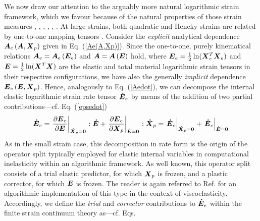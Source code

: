 \documentclass[preprint,review,12pt,sort&compress]{elsarticle}%
\newcommand{\xpdo}[0]{\scriptsize\mathbf{\dot X}_p = \mathbf{0}\normalsize\mathbf{}}
\newcommand{\edo}[0]{\scriptsize\mathbf{\dot E} = \mathbf{0}\normalsize\mathbf{}}
\renewcommand{\mathbf}[1]{\mbox{\boldmath $#1$ \unboldmath}  \!\!}
\begin{document}
We now draw our attention to the arguably more natural logarithmic strain
framework, which we favour because of the natural properties of those strain
measures \cite{Anand79}, \cite{Anand86}, \cite{Rice75}, \cite{RolphBathe84},
\cite{LatMonIJSS2014}, \cite{NeffGhiba16}. At large strains, both quadratic
and Hencky strains are related by one-to-one mapping tensors
\cite{LatMonAPM2016}. Consider the \emph{explicit} analytical dependence
$\mathbf{A}_{e}\left(  \mathbf{A},\mathbf{X}_{p}\right)  $ given in Eq.
(\ref{Ae(A,Xp)}). Since the one-to-one, purely kinematical relations
$\mathbf{A}_{e}=\mathbf{A}_{e}\left(  \mathbf{E}_{e}\right)  $ and
$\mathbf{A}=\mathbf{A}\left(  \mathbf{E}\right)  $ hold, where $\mathbf{E}%
_{e}=\frac{1}{2}\ln(\mathbf{X}_{e}^{T}\mathbf{X}_{e})$ and $\mathbf{E}%
=\frac{1}{2}\ln(\mathbf{X}^{T}\mathbf{X})$ are the elastic and total material
logarithmic strain tensors in their respective configurations, we have also
the generally \emph{implicit} dependence $\mathbf{E}_{e}\left(  \mathbf{E}%
,\mathbf{X}_{p}\right)  $. Hence, analogously to Eq. (\ref{Aedot}), we can
decompose the internal elastic logarithmic strain rate tensor $\mathbf{\dot
{E}}_{e}$ by means of the addition of two partial contributions---cf. Eq.
(\ref{epsedot})%
\begin{equation}
\mathbf{\dot{E}}_{e}=\left.  \frac{\partial\mathbf{E}_{e}}{\partial\mathbf{E}%
}\right\vert _{%
\xpdo
}:\mathbf{\dot{E}}+\left.  \frac{\partial\mathbf{E}_{e}}{\partial
\mathbf{X}_{p}}\right\vert _{%
\edo
}:\mathbf{\dot{X}}_{p}=\left.  \mathbf{\dot{E}}_{e}\right\vert _{%
\xpdo
}+\left.  \mathbf{\dot{E}}_{e}\right\vert _{%
\edo
} \label{Eedot}%
\end{equation}
As in the small strain case, this decomposition in rate form is the origin of
the operator split typically employed for elastic internal variables in
computational inelasticity within an algorithmic framework. As well known,
this operator split consists of a trial elastic predictor, for which
$\mathbf{X}_{p}$ is frozen, and a plastic corrector, for which $\mathbf{E}$ is
frozen. The reader is again referred to Ref. \cite{LatMonCM2015} for an
algorithmic implementation of this type in the context of viscoelasticity.
Accordingly, we define the \emph{trial} and \emph{corrector} contributions to
$\mathbf{\dot{E}}_{e}$ within the finite strain continuum theory as---cf. Eqs.
\end{document}
